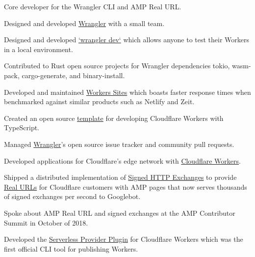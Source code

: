 \documentclass[]{deedy-resume-openfont}
\begin{document}
\vspace{\topsep}
Core developer for the Wrangler CLI and AMP Real URL.
\begin{tightemize}
\item Designed and developed \href{https://github.com/cloudflare/wrangler}{Wrangler} with a small team.
\item Designed and developed \href{https://github.com/cloudflare/wrangler/milestone/18}{`wrangler dev`} which allows anyone to test their Workers in a local environment.
\item Contributed to Rust open source projects for Wrangler dependencies tokio, wasm-pack, cargo-generate, and binary-install.
\item Developed and maintained \href{https://workers.cloudflare.com/sites}{Workers Sites} which boasts faster response times when benchmarked against similar products such as Netlify and Zeit.
\item Created an open source \href{https://github.com/EverlastingBugstopper/worker-typescript-template}{template} for developing Cloudflare Workers with TypeScript.
\item Managed \href{https://github.com/cloudflare/wrangler}{Wrangler}'s open source issue tracker and community pull requests.
\end{tightemize}
\sectionsep

\vspace{\topsep}
Developed applications for Cloudflare's edge network with \href{https://workers.cloudflare.com}{Cloudflare Workers}.
\begin{tightemize}
\item Shipped a distributed implementation of \href{https://wicg.github.io/webpackage/draft-yasskin-http-origin-signed-responses.html}{Signed HTTP Exchanges} to provide \href{https://www.cloudflare.com/website-optimization/amp-real-url/}{Real URLs} for Cloudflare customers with AMP pages that now serves thousands of signed exchanges per second to Googlebot.
\item Spoke about AMP Real URL and signed exchanges at the AMP Contributor Summit in October of 2018.
\item Developed the \href{https://developers.cloudflare.com/workers/tooling/serverless/}{Serverless Provider Plugin} for Cloudflare Workers which was the first official CLI tool for publishing Workers.
\end{tightemize}
\sectionsep
\end{document}
